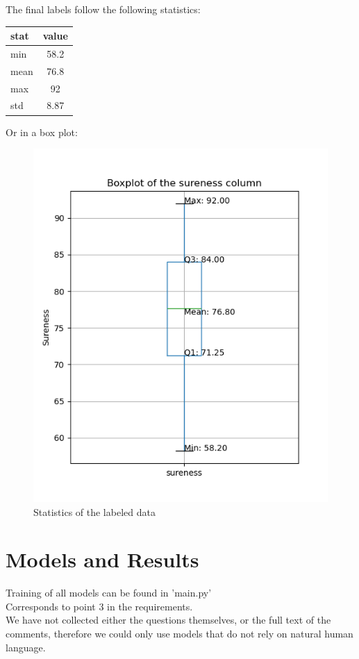 \documentclass[11pt, oneside]{article}   	%
\begin{document}
The final labels follow the following statistics:
\begin{table}[H]
\begin{center}
    \begin{tabular}{|l|c|}
    \hline
    stat & value \\
    \hline
    min & 58.2 \\
    mean & 76.8 \\
    max & 92 \\
    std & 8.87 \\
    \hline
    \end{tabular}
\end{center}
\end{table}

Or in a box plot:
\begin{figure}[H]\label{fig:sureness_stats}
    \begin{center}
    \includegraphics[height=0.7\linewidth]{../plots/sureness_boxplot}
    \caption{Statistics of the labeled data}
    \end{center}
\end{figure}


\section{Models and Results}
Training of all models can be found in 'main.py'\\
Corresponds to point 3 in the requirements.\\

We have not collected either the questions themselves, or the full text of the comments, therefore we could only use models that do not rely on natural human language.\\
\end{document}
